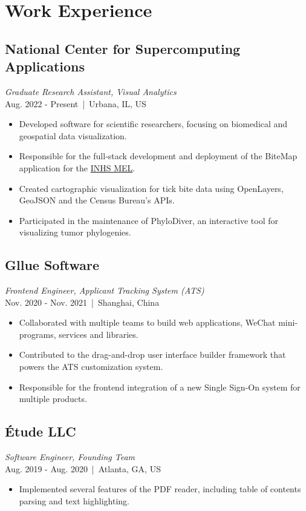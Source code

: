 \documentclass[11pt]{article}
\begin{document}
\begin{minipage}{280pt}

\section*{\sc Work Experience}

\subsection*{National Center for Supercomputing Applications}
\textit{Graduate Research Assistant, Visual Analytics} \\
Aug. 2022 - Present \,|\, Urbana, IL, US\\
\begin{itemize}
\item Developed software for scientific researchers, focusing on biomedical and geospatial data visualization.
\item Responsible for the full-stack development and deployment of the BiteMap application for the \href{https://medical-entomology.inhs.illinois.edu/}{INHS MEL}.
\item Created cartographic visualization for tick bite data using OpenLayers, GeoJSON and the Census Bureau's APIs.
\item Participated in the maintenance of PhyloDiver, an interactive tool for visualizing tumor phylogenies.
\end{itemize}

\subsection*{Gllue Software}
\textit{Frontend Engineer, Applicant Tracking System (ATS)}\\
Nov. 2020 - Nov. 2021 \,|\, Shanghai, China\\
\begin{itemize}
\item Collaborated with multiple teams to build web applications, WeChat mini-programs, services and libraries.
\item Contributed to the drag-and-drop user interface builder framework that powers the ATS customization system.
\item Responsible for the frontend integration of a new Single Sign-On system for multiple products.
\end{itemize}

\subsection*{Étude LLC}
\textit{Software Engineer, Founding Team}\\
Aug. 2019 - Aug. 2020 \,|\,  Atlanta, GA, US\\
\begin{itemize}
\item Implemented several features of the PDF reader, including table of contents parsing and text highlighting.
\end{itemize}


\end{minipage}
\end{document}
